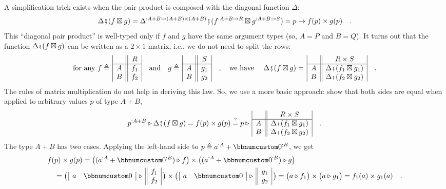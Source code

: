 A simplification trick exists when the pair product is composed with
the diagonal function $\Delta$:
\[
\Delta\bef(f\boxtimes g)=\Delta^{:A+B\rightarrow(A+B)\times(A+B)}\bef(f^{:A+B\rightarrow R}\boxtimes g^{:A+B\rightarrow S})=p\rightarrow f(p)\times g(p)\quad.
\]
This \textsf{``}diagonal pair product\textsf{''} is well-typed only if $f$ and $g$
have the same argument types (so, $A=P$ and $B=Q$). It turns out
that the function $\Delta\bef(f\boxtimes g)$ can be written as a
$2\times1$ matrix, i.e., we do not need to split the rows:
\[
\text{for any }f\triangleq\,\begin{array}{|c||c|}
 & R\\
\hline A & f_{1}\\
B & f_{2}
\end{array}\quad\text{and}\quad g\triangleq\,\begin{array}{|c||c|}
 & S\\
\hline A & g_{1}\\
B & g_{2}
\end{array}\quad,\quad\text{we have }\quad\Delta\bef(f\boxtimes g)=\,\begin{array}{|c||c|}
 & R\times S\\
\hline A & \Delta\bef(f_{1}\boxtimes g_{1})\\
B & \Delta\bef(f_{2}\boxtimes g_{2})
\end{array}\quad.
\]
The rules of matrix multiplication do not help in deriving this law.
So, we use a more basic approach: show that both sides are equal when
applied to arbitrary values $p$ of type $A+B$,
\[
p^{:A+B}\triangleright\Delta\bef(f\boxtimes g)=f(p)\times g(p)\overset{?}{=}p\triangleright\,\begin{array}{|c||c|}
 & R\times S\\
\hline A & \Delta\bef(f_{1}\boxtimes g_{1})\\
B & \Delta\bef(f_{2}\boxtimes g_{2})
\end{array}\quad.
\]
The type $A+B$ has two cases. Applying the left-hand side to $p\triangleq a^{:A}+\bbnum 0^{:B}$,
we get
\begin{align*}
 & f(p)\times g(p)=\big((a^{:A}+\bbnum 0^{:B})\triangleright f\big)\times\big((a^{:A}+\bbnum 0^{:B})\triangleright g\big)\\
 & \quad=\big(\,\begin{array}{|cc|}
a & \bbnum 0\end{array}\,\triangleright\,\begin{array}{||c|}
f_{1}\\
f_{2}
\end{array}\,\big)\times\big(\,\begin{array}{|cc|}
a & \bbnum 0\end{array}\,\triangleright\,\begin{array}{||c|}
g_{1}\\
g_{2}
\end{array}\,\big)=\big(a\triangleright f_{1}\big)\times\big(a\triangleright g_{1}\big)=f_{1}(a)\times g_{1}(a)\quad.
\end{align*}
